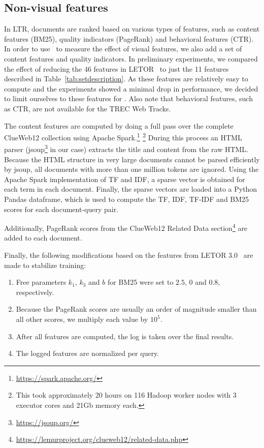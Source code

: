\subsection{Non-visual features} 
\label{sec:contentfeature}
In LTR, documents are ranked based on various types of features, such as content features (BM25), quality indicators (PageRank) and behavioral features (CTR).
In order to use \datasetname~to measure the effect of visual features, we also add a set of content features and quality indicators.
In preliminary experiments, we compared the effect of reducing the 46 features in LETOR~\cite{qin2010letor} to just the 11 features described in Table~\ref{tab:setdescription}.
As these features are relatively easy to compute and the experiments showed a minimal drop in performance, we decided to limit ourselves to these features for \datasetname.
Also note that behavioral features, such as CTR, are not available for the TREC Web Tracks.

The content features are computed by doing a full pass over the complete ClueWeb12 collection using Apache Spark.\footnote{\url{https://spark.apache.org/}}
$^{ }$\footnote{This took approximately 20 hours on 116 Hadoop worker nodes with 3 executor cores and 21Gb memory each.}
\fi
During this process an HTML parser (jsoup\footnote{\url{https://jsoup.org/}} in our case) extracts the title and content from the raw HTML.
Because the HTML structure in very large documents cannot be parsed efficiently by jsoup, all documents with more than one million tokens are ignored.
Using the Apache Spark implementation of TF and IDF, a sparse vector is obtained for each term in each document. Finally, the sparse vectors are loaded into a Python Pandas dataframe, which is used to compute the TF, IDF, TF-IDF and BM25 scores for each document-query pair.

Additionally, PageRank scores from the ClueWeb12 Related Data section\footnote{\url{https://lemurproject.org/clueweb12/related-data.php}} are added to each document.

Finally, the following modifications based on the features from LETOR 3.0~\cite{qin2010letor} are made to stabilize training:
\begin{enumerate}[nosep,leftmargin=14pt]
\item Free parameters $k_1$, $k_3$ and $b$ for BM25 were set to $2.5$, $0$ and $0.8$, respectively. 
\item Because the PageRank scores are usually an order of magnitude smaller than all other scores, we multiply each value by $10^5$.
\item After all features are computed, the log is taken over the final results.
\item The logged features are normalized per query.  
\end{enumerate}

